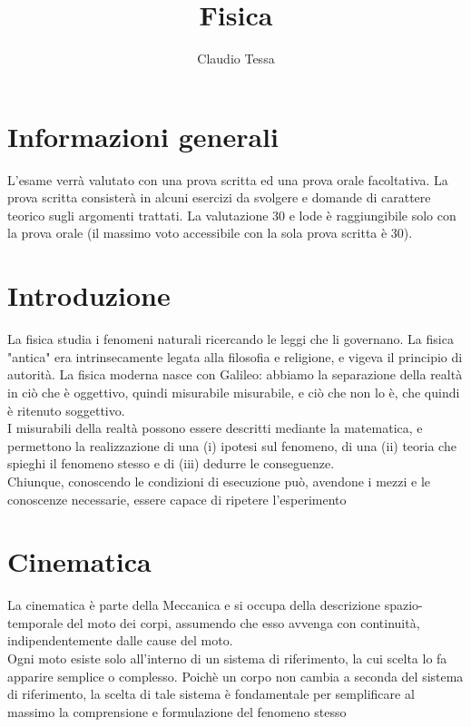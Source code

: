 \documentclass[12pt, a4paper]{article}
\title{Fisica}
\author{Claudio Tessa}
\date{\the\year}
\begin{document}
\maketitle

\section*{Informazioni generali}
L'esame verrà valutato con una prova scritta ed una prova orale facoltativa. La prova scritta consisterà in alcuni esercizi da svolgere e domande di carattere teorico sugli argomenti trattati. La valutazione 30 e lode è raggiungibile solo con la prova orale (il massimo voto accessibile con la sola prova scritta è 30).

\tableofcontents
\newpage


\section{Introduzione}

La fisica studia i fenomeni naturali ricercando le leggi che li governano. La fisica "antica" era intrinsecamente legata alla filosofia e religione, e vigeva il principio di autorità. La fisica moderna nasce con Galileo: abbiamo la separazione della realtà in ciò che è oggettivo, quindi misurabile misurabile, e ciò che non lo è, che quindi è ritenuto soggettivo.\\
I misurabili della realtà possono essere descritti mediante la matematica, e permettono la realizzazione di una (i) ipotesi sul fenomeno, di una (ii) teoria che spieghi il fenomeno stesso e di (iii) dedurre le conseguenze.\\
Chiunque, conoscendo le condizioni di esecuzione può, avendone i mezzi e le conoscenze necessarie, essere capace di ripetere l'esperimento


\section{Cinematica}
La cinematica è parte della Meccanica e si occupa della descrizione spazio-temporale del moto dei corpi, assumendo che esso avvenga con continuità, indipendentemente dalle cause del moto. \\
Ogni moto esiste solo all'interno di un sistema di riferimento, la cui scelta lo fa apparire semplice o complesso. Poichè un corpo non cambia a seconda del sistema di riferimento, la scelta di tale sistema è fondamentale per semplificare al massimo la comprensione e formulazione del fenomeno stesso
\end{document}
